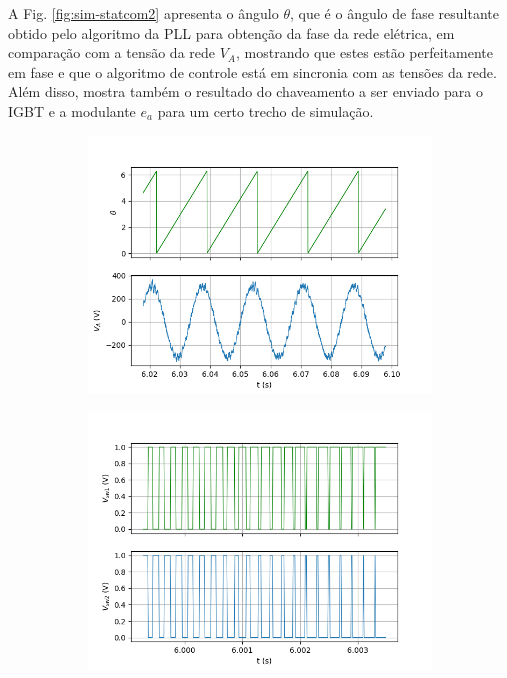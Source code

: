 A Fig. \ref{fig:sim-statcom2} apresenta o ângulo $\theta$, que é o ângulo de fase resultante obtido pelo algoritmo da PLL para obtenção da fase da rede elétrica, 
em comparação com a tensão da rede $V_A$, mostrando que estes estão perfeitamente em fase e que o algoritmo de controle está em sincronia com as tensões da rede.
Além disso, mostra também o resultado do chaveamento a ser enviado para o IGBT e a modulante $e_a$ para um certo trecho de simulação.

\begin{figure}[!hbt]
	\centering
	\begin{subfigure}[b]{0.49\textwidth}
		\centering
		\includegraphics[width=\textwidth]{figuras/sim_figures/statcom/teta.png}
		\caption{}
	\end{subfigure}
	\begin{subfigure}[b]{0.49\textwidth}
		\centering
		\includegraphics[width=\textwidth]{figuras/sim_figures/statcom/pwm.png}

\end{subfigure}
\end{figure}
